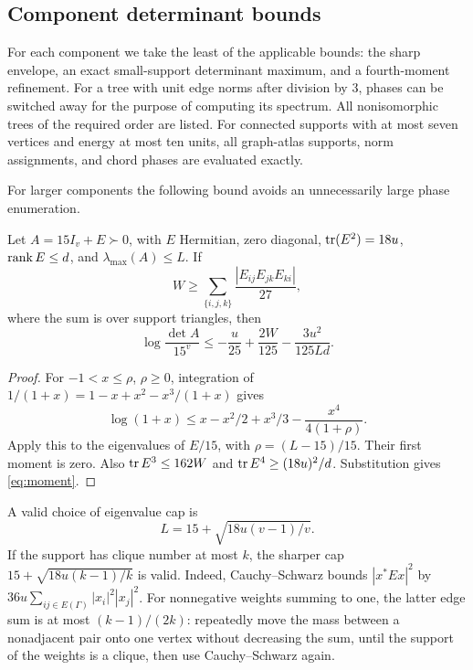 \subsection{Component determinant bounds}\label{sec:moments}
For each component we take the least of the applicable bounds: the sharp envelope, an exact small-support determinant maximum, and a fourth-moment refinement. For a tree with unit edge norms after division by 3, phases can be switched away for the purpose of computing its spectrum. All nonisomorphic trees of the required order are listed. For connected supports with at most seven vertices and energy at most ten units, all graph-atlas supports, norm assignments, and chord phases are evaluated exactly.

For larger components the following bound avoids an unnecessarily large phase enumeration.
\begin{lemma}\label{lem:moment}
Let $A=15I_v+E\succ0$, with $E$ Hermitian, zero diagonal, $\operatorname{tr}(E^2)=18u$, $\operatorname{rank} E\le d$, and $\lambda_{\max}(A)\le L$. If
\[
 W\ge\sum_{\{i,j,k\}}\frac{|E_{ij}E_{jk}E_{ki}|}{27},
\]
where the sum is over support triangles, then
\begin{equation}\label{eq:moment}
 \log\frac{\det A}{15^v}
 \le-\frac u{25}+\frac{2W}{125}-\frac{3u^2}{125Ld}.
\end{equation}
\end{lemma}
\begin{proof}
For $-1<x\le\rho$, $\rho\ge0$, integration of
$1/(1+x)=1-x+x^2-x^3/(1+x)$ gives
\[
 \log(1+x)\le x-x^2/2+x^3/3-\frac{x^4}{4(1+\rho)}.
\]
Apply this to the eigenvalues of $E/15$, with $\rho=(L-15)/15$. Their first moment is zero. Also $\operatorname{tr} E^3\le162W$ and $\operatorname{tr} E^4\ge(18u)^2/d$. Substitution gives \eqref{eq:moment}.
\end{proof}
A valid choice of eigenvalue cap is
\[
 L=15+\sqrt{18u(v-1)/v}.
\]
If the support has clique number at most $k$, the sharper cap $15+\sqrt{18u(k-1)/k}$ is valid. Indeed, Cauchy--Schwarz bounds $|x^*Ex|^2$ by $36u\sum_{ij\in E(\Gamma)}|x_i|^2|x_j|^2$. For nonnegative weights summing to one, the latter edge sum is at most $(k-1)/(2k)$: repeatedly move the mass between a nonadjacent pair onto one vertex without decreasing the sum, until the support of the weights is a clique, then use Cauchy--Schwarz again.

